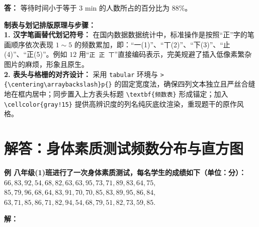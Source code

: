 \documentclass[12pt, a4paper]{ctexrep}
\begin{document}
\textbf{答：} 等待时间小于等于 $3\text{ min}$ 的人数所占的百分比为 $88\%$。

\vspace{0.6cm}

{\small\color{blue!70!black}
\textbf{制表与划记排版原理与步骤：}\\
\textbf{1. 汉字笔画替代划记符号：} 在国内数据数据统计中，标准操作是按照“正”字的笔画顺序依次表现 $1 \sim 5$ 的频数累加，即：“一(1)”、“丅(2)”、“下(3)”、“止(4)”、“正(5)”。例如 $12$ 用“\texttt{正~正~丅}”直接编码表示，完美规避了插入低像素繁杂图片的麻烦，形象且原生。\\
\textbf{2. 表头与格栅的对齐设计：} 采用 \texttt{tabular} 环境与 \texttt{>\{\textbackslash centering\textbackslash arraybackslash\}p\{\}} 的固定宽度法，确保四列文本独立且严丝合缝地在框内居中；同步置入上方表头标题 \texttt{\textbackslash textbf\{频数表\}} 形成锚定；加入 \texttt{\textbackslash cellcolor\{gray!15\}} 提供高辨识度的列名纯灰底纹渲染，重现题干的原作风格。
}

\newpage

\section{解答：身体素质测试频数分布与直方图}

\vspace{0.6cm}

\textbf{例 八年级(1)班进行了一次身体素质测试，每名学生的成绩如下（单位：分）：\\
$66, 83, 92, 54, 68, 82, 63, 63, 95, 73, 71, 89, 83, 64, 75,$ \\
$85, 79, 96, 68, 64, 83, 91, 70, 70, 85, 83, 89, 95, 86, 84,$ \\
$63, 71, 85, 86, 71, 82, 94, 54, 68, 79, 51, 82, 73, 59, 85.$}

\vspace{0.4cm}

\textbf{解：}
\end{document}
